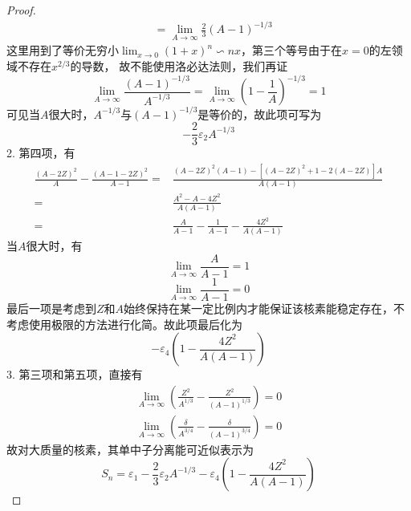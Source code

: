 \begin{proof}
\begin{equation}
\begin{aligned}
            &= \lim_{A \to \infty} \frac{2}{3} (A - 1)^{-1/3}
        \end{aligned}
    \end{equation}
    这里用到了等价无穷小$\lim_{x \to 0}(1 + x)^{n} \backsim n x$，第三个等号由于在$x = 0$的左领域不存在$x^{2/3}$的导数，
    故不能使用洛必达法则，我们再证
    \begin{equation*}
        \lim_{A \to \infty} \frac{(A - 1)^{-1/3}}{A^{-1/3}} = \lim_{A \to \infty}\left(1 - \frac{1}{A}\right)^{-1/3}
        = 1
    \end{equation*}
    可见当$A$很大时，$A^{-1/3}$与$(A - 1)^{-1/3}$是等价的，故此项可写为
    $$-\frac{2}{3}\varepsilon_2 A^{-1/3}$$
    2. 第四项，有
    \begin{equation*}
        \begin{aligned}
            \frac{(A - 2Z)^2}{A} - \frac{(A - 1 - 2Z)^2}{A - 1}
            =& \frac{(A - 2Z)^2(A - 1) - [(A - 2Z)^2 + 1 - 2(A - 2Z)]A}{A(A - 1)} \\
            =& \frac{A^2 - A - 4Z^2}{A(A - 1)} \\
            =& \frac{A}{A - 1} - \frac{1}{A - 1} - \frac{4Z^2}{A(A - 1)}
        \end{aligned}
    \end{equation*}
    当$A$很大时，有
    $$\lim_{A \to \infty} \frac{A}{A - 1} = 1$$
    $$\lim_{A \to \infty} \frac{1}{A - 1} = 0$$
    最后一项是考虑到$Z$和$A$始终保持在某一定比例内才能保证该核素能稳定存在，不考虑使用极限的方法进行化简。故此项最后化为
    $$-\varepsilon_4(1 - \frac{4Z^2}{A(A - 1)})$$
    3. 第三项和第五项，直接有
    \begin{equation}
        \begin{aligned}
            \lim_{A \to \infty} \left(\frac{Z^2}{A^{1/3}} - \frac{Z^2}{(A - 1)^{1/3}}\right) = 0 \\
            \lim_{A \to \infty} \left(\frac{\delta}{A^{3/4}} - \frac{\delta}{(A - 1)^{3/4}}\right) = 0
        \end{aligned}
    \end{equation}
    故对大质量的核素，其单中子分离能可近似表示为
    $$S_n = \varepsilon_1 - \frac{2}{3}\varepsilon_2 A^{-1/3} - \varepsilon_4(1 - \frac{4Z^2}{A(A - 1)})$$
\end{proof}